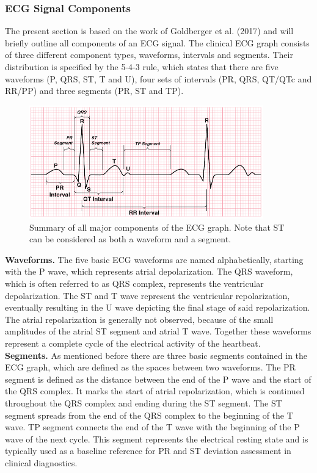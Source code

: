 \subsubsection{ECG Signal Components}
The present section is based on the work of Goldberger et al. (2017) and will briefly outline all components of an ECG signal. The clinical ECG graph consists of three different component types, waveforms, intervals and segments. Their distribution is specified by the 5-4-3 rule, which states that there are five waveforms (P, QRS, ST, T and U), four sets of intervals (PR, QRS, QT/QTc and RR/PP) and three segments (PR, ST and TP)\cite{GOLDBERGER2017}.

\begin{figure}[ht]
\centering
\includegraphics[width=0.9\textwidth]{images/ecgcomp.png}
\caption{Summary of all major components of the ECG graph. Note that ST can be considered as both a waveform and a segment.\citep{GOLDBERGER2017}}
\label{ecgcompImg}
\end{figure}

\textbf{Waveforms.} The five basic ECG waveforms are named alphabetically, starting with the P wave, which represents atrial depolarization. The QRS waveform, which is often referred to as QRS complex, represents the ventricular depolarization. The ST and T wave represent the ventricular repolarization, eventually resulting in the U wave depicting the final stage of said repolarization. The atrial repolarization is generally not observed, because of the small amplitudes of the atrial ST segment and atrial T wave. Together these waveforms represent a complete cycle of the electrical activity of the heartbeat.\\

\textbf{Segments.} As mentioned before there are three basic segments contained in the ECG graph, which are defined as the spaces between two waveforms. The PR segment is defined as the distance between the end of the P wave and the start of the QRS complex. It marks the start of atrial repolarization, which is continued throughout the QRS complex and ending during the ST segment. The ST segment spreads from the end of the QRS complex to the beginning of the T wave. TP segment connects the end of the T wave with the beginning of the P wave of the next cycle. This segment represents the electrical resting state and is typically used as a baseline reference for PR and ST deviation assessment in clinical diagnostics.\\


